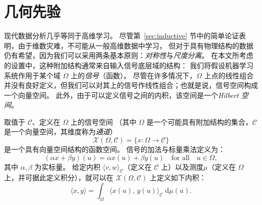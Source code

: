 \newpage
\section{几何先验}
\label{sec:geom_priors}
现代数据分析几乎等同于高维学习。
尽管第~\ref{sec:inductive} 节中的简单论证表明，由于维数灾难，不可能从一般高维数据中学习，
但对于具有物理结构的数据仍有希望，因为我们可以采用两条基本原则：{\em 对称性}与{\em 尺度分离}。
在本文所考虑的设置中，这种附加结构通常来自输入信号底层域的结构：
我们将假设机器学习系统作用于某个域 $\Omega$ 上的\emph{信号}（函数）。
%
尽管在许多情况下，$\Omega$ 上点的线性组合并没有良好定义，但我们可以对其上的信号作线性组合；也就是说，信号空间构成一个向量空间。
此外，由于可以定义信号之间的内积，该空间是一个{\em Hilbert 空间}。

\begin{tcolorbox}[width=\linewidth,
                  boxsep=0pt,
                  left=7.5pt,
                  right=7.5pt,
                  top=7.5pt,
                  bottom=7.5pt,
                  arc=0pt,
                  boxrule=0pt,toprule=0pt,
                  colback=boxgray,
                  ]%

取值于 $\mathcal{C}$、定义在 $\Omega$ 上的信号空间
（其中 $\Omega$ 是一个可能具有附加结构的集合，$\mathcal{C}$ 是一个向量空间，其维度称为\emph{通道}）
\begin{equation}
    \mathcal{X}(\Omega, \mathcal{C}) = \{ x : \Omega \rightarrow \mathcal{C} \}
\end{equation}
%
是一个具有向量空间结构的函数空间。
信号的加法与标量乘法定义为：
\begin{equation*}
    (\alpha x + \beta y)(u) = \alpha x(u) + \beta y(u) \quad \text{for all} \quad u\in \Omega,
\end{equation*}
其中 $\alpha, \beta$ 为实标量。%
%
给定内积 $\langle v, w \rangle_\mathcal{C}$（定义在 $\mathcal{C}$ 上）以及测度$\mu$（定义在 $\Omega$ 上，并可据此定义积分），就可以在 $\mathcal{X}(\Omega, \mathcal{C})$ 上定义如下内积：
\begin{equation}
    \langle x, y \rangle = \int_{\Omega} \langle x(u), \, y(u) \rangle_{\mathcal{C}} \; \mathrm{d}\mu(u).
    \label{eqn:innerprod}
\end{equation}
\end{tcolorbox}


